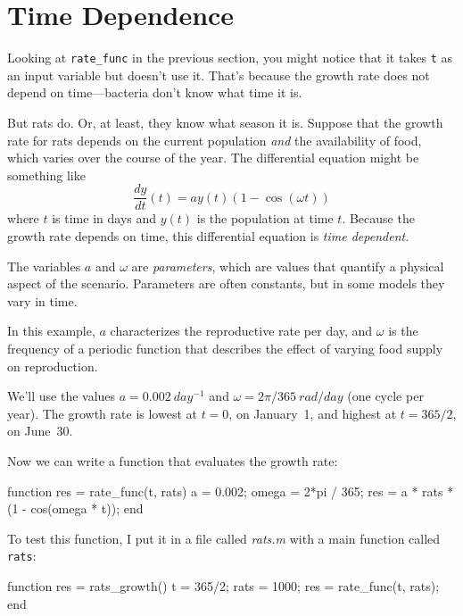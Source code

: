 \section{Time Dependence}

Looking at \lstinline{rate_func} in the previous section, you might notice that it takes \lstinline{t} as an input variable but doesn't use it.  That's because the growth rate does not depend on time---bacteria don't know what time it is.


But rats do.  Or, at least, they know what season it is.
Suppose that the growth rate for rats depends on the current population \emph{and} the availability of food, which varies over the course of the year.
The differential equation might be something like
%
\begin{equation*}
\frac{dy}{dt}(t) = a y(t) \left(1 - \cos (\omega t) \right)
\end{equation*}
%
where $t$ is time in days and $y(t)$ is the population at time $t$.
Because the growth rate depends on time, this differential equation is \emph{time dependent}.

The variables $a$ and $\omega$ are \emph{parameters}, which are values that
quantify a physical aspect of the scenario.  Parameters are often constants, but in some models they vary in time.


In this example, $a$ characterizes the reproductive rate per day, and
$\omega$ is the frequency of a periodic function that describes
the effect of varying food supply on reproduction.

We'll use the values $a = \SI{0.002}{day^{-1}}$
and $\omega = 2 \pi / 365 \SI{}{rad/day}$ (one cycle per year).
The growth rate is lowest at $t=0$, on January~1, and highest at $t=365/2$, on June~30.

Now we can write a function that evaluates the growth rate:

\begin{code}
function res = rate_func(t, rats)
    a = 0.002;
    omega = 2*pi / 365;
    res = a * rats * (1 - cos(omega * t));
end
\end{code}

To test this function, I put it in a file called \emph{rats.m} with a main function called
\lstinline{rats}:

\begin{code}
function res = rats_growth()
    t = 365/2;
    rats = 1000;
    res = rate_func(t, rats);
end
\end{code}

